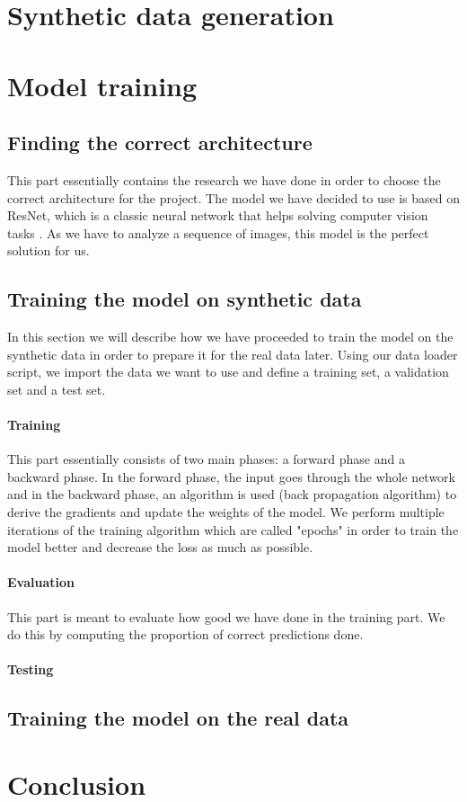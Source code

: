 \documentclass[10pt,conference,compsocconf]{IEEEtran}
\begin{document}
\section{Synthetic data generation}

\section{Model training}
\subsection{Finding the correct architecture}
This part essentially contains the research we have done in order to choose the correct architecture for the project. The model we have decided to use is based on ResNet, which is a classic neural network that helps solving computer vision tasks \cite{hara3dcnns}. As we have to analyze a sequence of images, this model is the perfect solution for us.

\subsection{Training the model on synthetic data}
In this section we will describe how we have proceeded to train the model on the synthetic data in order to prepare it for the real data later. Using our data loader script, we import the data we want to use and define a training set, a validation set and a test set.
\paragraph{Training} This part essentially consists of two main phases: a forward phase and a backward phase. In the forward phase, the input goes through the whole network and in the backward phase, an algorithm is used (back propagation algorithm) to derive the gradients and update the weights of the model. We perform multiple iterations of the training algorithm which are called "epochs" in order to train the model better and decrease the loss as much as possible.
\paragraph{Evaluation} This part is meant to evaluate how good we have done in the training part. We do this by computing the proportion of correct predictions done.
\paragraph{Testing} %

\subsection{Training the model on the real data}

\section{Conclusion}



\end{document}
